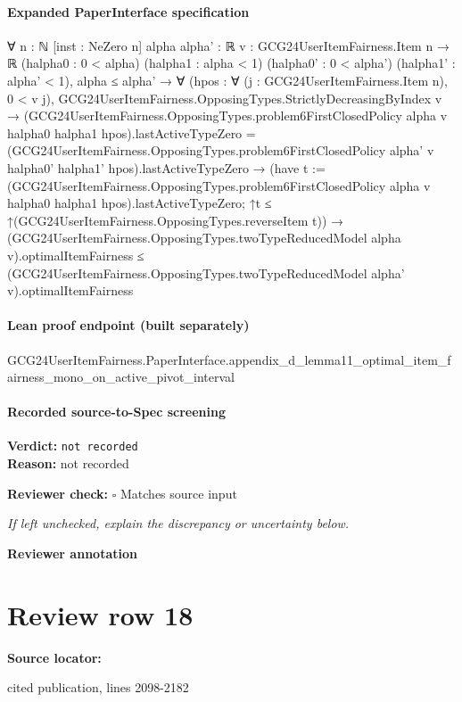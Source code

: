 \documentclass[10pt]{article}
\newcommand{\reviewerbox}{%
  \par\noindent\fbox{\parbox{0.96\linewidth}{\rule{0pt}{0.38in}}}\par
}
\newcommand{\reviewmatch}[1]{%
  \par\noindent\textbf{Reviewer check:} $\square$\; #1\par
  \noindent\emph{If left unchecked, explain the discrepancy or uncertainty below.}\par
}
\begin{document}
\paragraph{Expanded PaperInterface specification}
\begin{ReviewVerbatim}
∀ {n : ℕ} [inst : NeZero n] {alpha alpha' : ℝ} {v : GCG24UserItemFairness.Item n → ℝ} (halpha0 : 0 < alpha)
  (halpha1 : alpha < 1) (halpha0' : 0 < alpha') (halpha1' : alpha' < 1),
  alpha ≤ alpha' →
    ∀ (hpos : ∀ (j : GCG24UserItemFairness.Item n), 0 < v j),
      GCG24UserItemFairness.OpposingTypes.StrictlyDecreasingByIndex v →
        (GCG24UserItemFairness.OpposingTypes.problem6FirstClosedPolicy alpha v halpha0 halpha1
                hpos).lastActiveTypeZero =
            (GCG24UserItemFairness.OpposingTypes.problem6FirstClosedPolicy alpha' v halpha0' halpha1'
                hpos).lastActiveTypeZero →
          (have t :=
              (GCG24UserItemFairness.OpposingTypes.problem6FirstClosedPolicy alpha v halpha0 halpha1
                  hpos).lastActiveTypeZero;
            ↑t ≤ ↑(GCG24UserItemFairness.OpposingTypes.reverseItem t)) →
            (GCG24UserItemFairness.OpposingTypes.twoTypeReducedModel alpha v).optimalItemFairness ≤
              (GCG24UserItemFairness.OpposingTypes.twoTypeReducedModel alpha' v).optimalItemFairness
\end{ReviewVerbatim}

\paragraph{Lean proof endpoint (built separately)}\begin{ReviewVerbatim}
GCG24UserItemFairness.PaperInterface.appendix_d_lemma11_optimal_item_fairness_mono_on_active_pivot_interval
\end{ReviewVerbatim}

\paragraph{Recorded source-to-Spec screening}
\textbf{Verdict:} \texttt{not recorded}
\\
\textbf{Reason:} not recorded
\reviewmatch{Matches source input}
\noindent\textbf{Reviewer annotation}\par
\reviewerbox
\clearpage
\hypertarget{source-claim-2174fb755f649010}{}
\section*{Review row 18}
\textbf{Source locator:} {\footnotesize\raggedright cited publication, lines 2098-\allowbreak{}2182\par}
\end{document}
